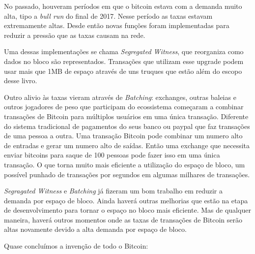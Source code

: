 No passado, houveram períodos em que o bitcoin estava com a demanda muito alta, tipo a \textit{bull run} do final de 2017. Nesse período as taxas estavam extremamente altas. Desde então novas funções foram implementadas para reduzir a pressão que as taxas causam na rede.

Uma dessas implementações se chama \textit{Segregated Witness}, que reorganiza como dados no bloco são representados. Transações que utilizam esse upgrade podem usar mais que 1MB de espaço através de uns truques que estão além do escopo desse livro.

Outro alivio às taxas vieram através de \textit{Batching}: exchanges,  outras baleias e outros jogadores de peso que participam do ecossistema começaram a combinar transações de Bitcoin para múltiplos usuários em uma única transação. Diferente do sistema tradicional de pagamentos do seus banco ou paypal que faz transações de uma pessoa a outra. Uma transação Bitcoin pode combinar um numero alto de entradas e gerar um numero alto de saídas. Então uma exchange que necessita enviar bitcoins para saque de 100 pessoas pode fazer isso em uma única transação. O que torna muito mais eficiente a utilização do espaço de bloco, um possível punhado de transações por segundos em algumas milhares de transações.

\textit{Segragated Witness} e \textit{Batching} já fizeram um bom trabalho em reduzir a demanda por espaço de bloco. Ainda haverá outras melhorias que estão na etapa de desenvolvimento para tornar o espaço no bloco mais eficiente. Mas de qualquer maneira, haverá outros momentos onde as taxas de transações de Bitcoin serão altas novamente devido a alta demanda por espaço de bloco.


Quase concluímos a invenção de todo o Bitcoin:

